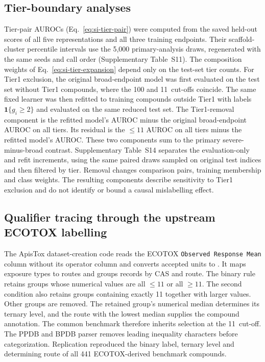 \documentclass[10pt]{article}
\begin{document}
\subsection*{Tier-boundary analyses}
Tier-pair AUROCs (Eq.~\eqref{eq:si-tier-pair}) were computed from the saved held-out scores of all five representations and all three training endpoints. Their scaffold-cluster percentile intervals use the 5,000 primary-analysis draws, regenerated with the same seeds and call order (Supplementary Table~S11). The composition weights of Eq.~\eqref{eq:si-tier-expansion} depend only on the test-set tier counts. For Tier1 exclusion, the original broad-endpoint model was first evaluated on the test set without Tier1 compounds, where the 100 and 11~\ugbee cut-offs coincide. The same fixed learner was then refitted to training compounds outside Tier1 with labels \(\mathbf1\{g_i\geq2\}\) and evaluated on the same reduced test set. The Tier1-removal component is the refitted model's AUROC minus the original broad-endpoint AUROC on all tiers. Its residual is the \(\leq11\) AUROC on all tiers minus the refitted model's AUROC. These two components sum to the primary severe-minus-broad contrast. Supplementary Table~S14 separates the evaluation-only and refit increments, using the same paired draws sampled on original test indices and then filtered by tier. Removal changes comparison pairs, training membership and class weights. The resulting components describe sensitivity to Tier1 exclusion and do not identify or bound a causal mislabelling effect.

\subsection*{Qualifier tracing through the upstream ECOTOX labelling}
The ApisTox dataset-creation code reads the ECOTOX \texttt{Observed Response Mean} column without its operator column and converts accepted units to \ugbee. It maps exposure types to routes and groups records by CAS and route. The binary rule retains groups whose numerical values are all \(\leq11\) or all \(\geq11\). The second condition also retains groups containing exactly 11 together with larger values. Other groups are removed. The retained group's numerical median determines its ternary level, and the route with the lowest median supplies the compound annotation. The common benchmark therefore inherits selection at the 11~\ugbee cut-off. The PPDB and BPDB parser removes leading inequality characters before categorization. Replication reproduced the binary label, ternary level and determining route of all 441 ECOTOX-derived benchmark compounds.
\end{document}
